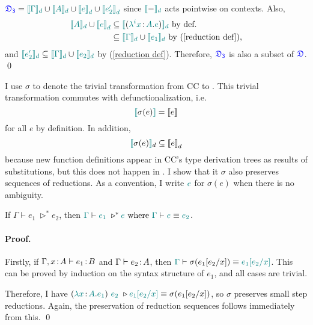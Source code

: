 \begin{lemma}
$\target{\fdef_3} = \hbracketd{\helper{\Gamma}} \cup \hbracketd{\helper{A}} \cup \helper{\bbracket{e}_d} \cup \helper{\bbracket{e_2'}_d}$ since $\color{teal}{[\![}\color{black}{-}\color{teal}{]\!]_d}\color{black}$ acts pointwise on contexts. Also, 
\begin{align*}
	\hbracketd{\helper{A}} \cup \helper{\bbracket{e}_d} &\subseteq \hbracketd{(\helper{\lambda^i x} \goodcolon \helper{A} . \helper{e})} \text{ by def.}\\
	&\subseteq \hbracketd{\helper{\Gamma}} \cup \hbracketd{\helper{e_1}} \text{ by (\eqref{reduction def})},
\end{align*}
and $\color{teal}{[\![}\color{black}{\color{teal}{e_2'}\color{black}}\color{teal}{]\!]_d}\color{black} \subseteq \color{teal}{[\![}\color{black}{\color{teal}{\Gamma}\color{black}}\color{teal}{]\!]_d}\color{black} \cup \color{teal}{[\![}\color{black}{\color{teal}{e_2}\color{black}}\color{teal}{]\!]_d}\color{black}$ by (\eqref{reduction def}). Therefore, $\target{\fdef_3}$ is also a subset of $\target{\fdef}$. \qed
\label{lem:ccs coherence}
\end{lemma}

I use $\sigma$ to denote the trivial transformation from CC to {\ccs}. This trivial transformation commutes with defunctionalization, i.e.
\begin{equation}
\color{teal}{[\![}\color{black}{\sigma(e)}\color{teal}{]\!]}\color{black} = {[\![ e ]\!]}
\label{eq:commute}
\end{equation}
for all $e$ by definition. In addition, 
\begin{equation}
\color{teal}{[\![}\color{black}{\sigma(e)}\color{teal}{]\!]}\color{black}_d \subseteq {[\![ e ]\!]}_d
\label{eq:commute_d}
\end{equation}
because new function definitions appear in CC's type derivation trees as results of substitutions, but this does not happen in {\ccs}.  I show that it $\sigma$ also preserves sequences of reductions. As a convention, I write $\color{teal}{e}\color{black}$ for $\sigma(e)$ when there is no ambiguity.
\begin{lemma} If $\Gamma \vdash e_1\ \triangleright^* e_2$, then
$\helper{\Gamma} \vdash \helper{e_1}\ \triangleright^* \helper{e} \text{ where } \helper{\Gamma} \vdash \helper{e} \equiv \helper{e_2}$.
\paragraph{Proof.} Firstly, if $\Gamma, x \hspace{0.5mm}{:}\hspace{0.5mm} A \vdash e_1 \hspace{0.5mm}{:}\hspace{0.5mm} B$ and $\Gamma \vdash e_2 \hspace{0.5mm}{:}\hspace{0.5mm} A$, then
$\color{teal}{\Gamma}\color{black} \vdash \sigma(e_1[e_2\slash x]) \equiv \color{teal}{e_1[e_2\slash x]}\color{black}$. This can be proved by induction on the syntax structure of $e_1$, and all cases are trivial.

Therefore, I have $(\color{teal}{\lambda x}\color{black} \hspace{0.5mm}{:}\hspace{0.5mm} \color{teal}{A}\color{black}. \color{teal}{e_1}\color{black})\ \color{teal}{e_2}\color{black}\ \triangleright 
\color{teal}{e_1[e_2\slash x]}\color{black} \equiv \sigma(e_1[e_2\slash x])$, so $\sigma$ preserves small step reductions. Again, the preservation of reduction sequences follows immediately from this. \qed 
\label{lem:sigma prev sequence}
\end{lemma}

